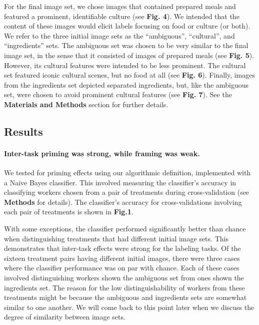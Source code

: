 \documentclass[a4paper]{report}
\begin{document}
For the final image set, we chose 
images that contained prepared meals and featured a prominent, identifiable 
culture (see \textbf{Fig. 4}).  We intended that the content of these images 
would elicit labels focusing on food or culture (or both).
We refer to the three initial image sets as the ``ambiguous'', ``cultural'', 
and ``ingredients'' sets.  The ambiguous set was chosen to
be very similar to the final image set, in the sense that it consisted of
images of prepared meals (see \textbf{Fig. 5}).  However, its cultural 
features were intended to be less prominent.  The cultural set featured 
iconic cultural scenes, but no food at all (see \textbf{Fig. 6}).  Finally, 
images from the 
ingredients set depicted separated ingredients, but, 
like the ambiguous set, were chosen to avoid prominent cultural features (see 
\textbf{Fig. 7}).  See the \textbf{Materials and Methods} section for further 
details.

\subsection*{Results}
\paragraph{Inter-task priming was strong, while framing was weak.}
We tested for priming effects using our algorithmic definition, implemented 
with a Naive Bayes classifier.  This involved measuring the classifier's 
accuracy in classifying workers chosen from a pair of treatments during 
cross-validation (see \textbf{Methods} for details).  The classifier's accuracy
for cross-validations involving each pair of treatments is shown in 
\textbf{Fig.1}.

With some exceptions, the classifier performed significantly better 
than chance when distinguishing treatments that had different initial image 
sets.  This demonstrates that inter-task effects were strong for the labeling 
tasks.  Of the sixteen treatment pairs having different initial images, there 
were three cases where the classifier performance was on par with chance. 
Each of these cases involved distinguishing workers shown the ambiguous set 
from ones shown the ingredients set.  The reason for the low 
distinguishability of workers from these treatments might be because
the ambiguous and ingredients sets are somewhat similar to one another.
We will come back to this point later when we discuss the degree of similarity 
between image sets.
\end{document}
